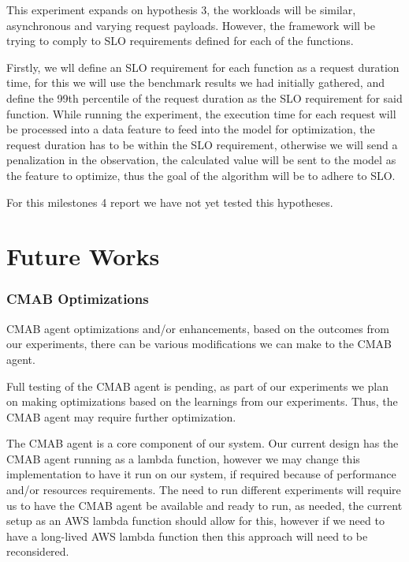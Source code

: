 \documentclass[conference]{IEEEtran}
\begin{document}
This experiment expands on hypothesis 3, the workloads will be similar, asynchronous and varying request payloads. However, the framework will be trying to comply to SLO requirements defined for each of the functions.

Firstly, we wll define an SLO requirement for each function as a request duration time, for this we will use the benchmark results we had initially gathered, and define the 99th percentile of the request duration as the SLO requirement for said function. While running the experiment, the execution time for each request will be processed into a data feature to feed into the model for optimization, the request duration has to be within the SLO requirement, otherwise we will send a penalization in the observation, the calculated value will be sent to the model as the feature to optimize, thus the goal of the algorithm will be to adhere to SLO.

For this milestones 4 report we have not yet tested this hypotheses.


\section{Future Works}

\subsubsection{CMAB Optimizations}

CMAB agent optimizations and/or enhancements, based on the outcomes from our experiments, there can be various modifications we can make to the CMAB agent.

Full testing of the CMAB agent is pending, as part of our experiments we plan on making optimizations based on the learnings from our experiments. Thus, the CMAB agent may require further optimization.

The CMAB agent is a core component of our system. Our current design has the CMAB agent running as a lambda function, however we may change this implementation to have it run on our system, if required because of performance and/or resources requirements. The need to run different experiments will require us to have the CMAB agent be available and ready to run, as needed, the current setup as an AWS lambda function should allow for this, however if we need to have a long-lived AWS lambda function then this approach will need to be reconsidered.
\end{document}
